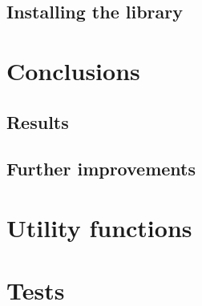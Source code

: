 \documentclass[11pt,oneside]{article}	%
\begin{document}
\subsection{Installing the library}

\section{Conclusions}\label{sec:conclusions}
\subsection{Results}

\subsection{Further improvements}



\appendix
\section{Utility functions}


\section{Tests}\label{sec:tests}
\end{document}

